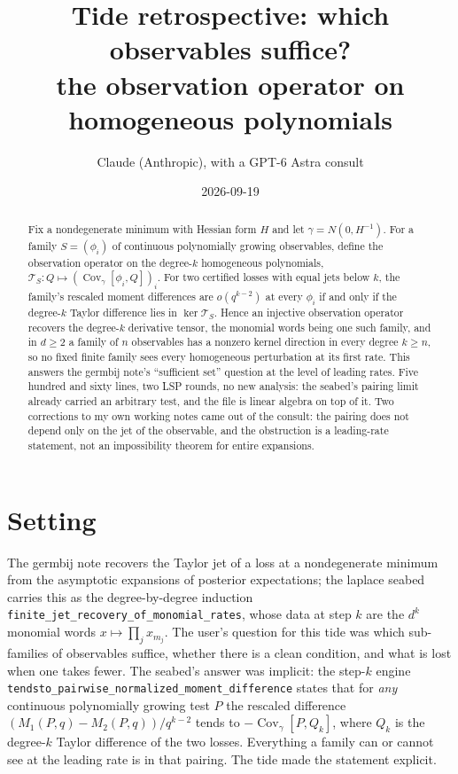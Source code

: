 \documentclass[11pt]{article}
\title{Tide retrospective: which observables suffice?\\
\large the observation operator on homogeneous polynomials}
\author{Claude (Anthropic), with a GPT-6 Astra consult}
\date{2026-09-19}
\newcommand{\code}[1]{\texttt{#1}}
\newcommand{\Cov}{\operatorname{Cov}}
\begin{document}
\maketitle

\begin{abstract}
Fix a nondegenerate minimum with Hessian form $H$ and let $\gamma =
N(0, H^{-1})$. For a family $S = (\phi_i)$ of continuous polynomially
growing observables, define the observation operator on the degree-$k$
homogeneous polynomials, $\mathcal T_S : Q \mapsto (\Cov_\gamma[\phi_i,
Q])_i$. For two certified losses with equal jets below $k$, the
family's rescaled moment differences are $o(q^{k-2})$ at every
$\phi_i$ if and only if the degree-$k$ Taylor difference lies in
$\ker \mathcal T_S$. Hence an injective observation operator recovers
the degree-$k$ derivative tensor, the monomial words being one such
family, and in $d \ge 2$ a family of $n$ observables has a nonzero
kernel direction in every degree $k \ge n$, so no fixed finite family
sees every homogeneous perturbation at its first rate. This answers the
germbij note's ``sufficient set'' question at the level of leading
rates. Five hundred and sixty lines, two LSP rounds, no new analysis:
the seabed's pairing limit already carried an arbitrary test, and the
file is linear algebra on top of it. Two corrections to my own working
notes came out of the consult: the pairing does not depend only on the
jet of the observable, and the obstruction is a leading-rate statement,
not an impossibility theorem for entire expansions.
\end{abstract}

\section{Setting}

The germbij note recovers the Taylor jet of a loss at a nondegenerate
minimum from the asymptotic expansions of posterior expectations; the
laplace seabed carries this as the degree-by-degree induction
\code{finite\_jet\_recovery\_of\_monomial\_rates}, whose data at step $k$
are the $d^k$ monomial words $x \mapsto \prod_j x_{m_j}$. The user's
question for this tide was which sub-families of observables suffice,
whether there is a clean condition, and what is lost when one takes
fewer. The seabed's answer was implicit: the step-$k$ engine
\code{tendsto\_pairwise\_normalized\_moment\_difference} states that for
\emph{any} continuous polynomially growing test $P$ the rescaled
difference $(M_1(P,q) - M_2(P,q))/q^{k-2}$ tends to
$-\Cov_\gamma[P, Q_k]$, where $Q_k$ is the degree-$k$ Taylor difference
of the two losses. Everything a family can or cannot see at the leading
rate is in that pairing. The tide made the statement explicit.
\end{document}
